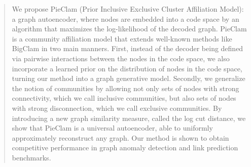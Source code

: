 \documentclass{article}
\theoremstyle{plain}
\theoremstyle{definition}
\theoremstyle{remark}
\newcommand{\dan}[1]{{{\textcolor{blue}{ {#1}\textbf{}}}}}
\begin{document}
\begin{abstract}






We propose PieClam (Prior Inclusive Exclusive Cluster Affiliation Model): a graph autoencoder, where nodes are embedded into a code space by an algorithm that maximizes the log-likelihood of the decoded graph. PieClam is a community affiliation model that extends well-known methods like BigClam in two main manners. First, instead of the decoder being defined via pairwise interactions between the nodes in the code space, we also incorporate a learned prior on the distribution of nodes in the code space, turning our method into a graph generative model. Secondly, we generalize the notion of communities by allowing not only sets of nodes with strong connectivity, which we call inclusive communities, but also sets of nodes with strong disconnection, which we call exclusive communities. By introducing a new graph similarity measure, called the log cut distance, we show that PieClam is a universal autoencoder, able to uniformly approximately reconstruct any graph. Our method is shown to obtain competitive performance in graph anomaly detection and link prediction benchmarks.

\end{abstract}
\end{document}
